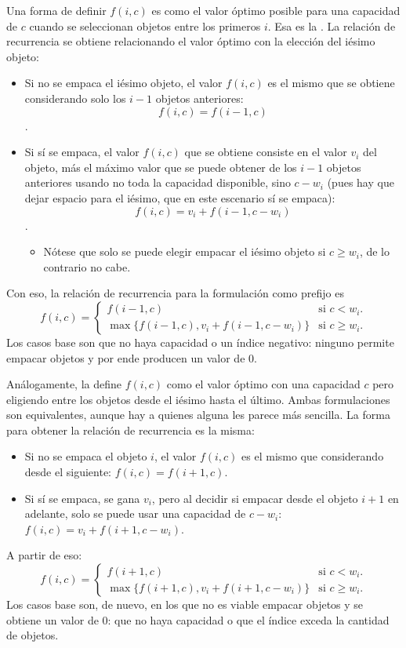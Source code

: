 Una forma de definir \(f(i, c)\) es como el valor óptimo posible para una capacidad de \(c\) cuando se seleccionan objetos entre los primeros \(i\). Esa es la . La relación de recurrencia se obtiene relacionando el valor óptimo con la elección del iésimo objeto:
\begin{itemize}
  \item Si no se empaca el iésimo objeto, el valor \(f(i, c)\) es el mismo que se obtiene considerando solo los \(i-1\) objetos anteriores: \[f(i, c) = f(i-1, c)\].
  \item Si sí se empaca, el valor \(f(i, c)\) que se obtiene consiste en el valor \(v_i\) del objeto, más el máximo valor que se puede obtener de los \(i-1\) objetos anteriores usando no toda la capacidad disponible, sino \(c-w_i\) (pues hay que dejar espacio para el iésimo, que en este escenario sí se empaca): \[f(i, c) = v_i + f(i-1, c-w_i)\].
  \begin{itemize}
    \item Nótese que solo se puede elegir empacar el iésimo objeto si \(c \geq w_i\), de lo contrario no cabe.
  \end{itemize}
\end{itemize}
Con eso, la relación de recurrencia para la formulación como prefijo es
\[
f(i, c) = \begin{cases}
  f(i-1, c) & \text{si } c < w_i. \\
  \max\{f(i-1, c), v_i + f(i-1, c-w_i)\} & \text{si } c \geq w_i.
\end{cases}
\]
Los casos base son que no haya capacidad o un índice negativo: ninguno permite empacar objetos y por ende producen un valor de 0.

Análogamente, la  define \(f(i, c)\) como el valor óptimo con una capacidad \(c\) pero eligiendo entre los objetos desde el iésimo hasta el último. Ambas formulaciones son equivalentes, aunque hay a quienes alguna les parece más sencilla. La forma para obtener la relación de recurrencia es la misma:
\begin{itemize}
  \item Si no se empaca el objeto \(i\), el valor \(f(i, c)\) es el mismo que considerando desde el siguiente: \(f(i, c) = f(i+1, c)\).
  \item Si sí se empaca, se gana \(v_i\), pero al decidir si empacar desde el objeto \(i+1\) en adelante, solo se puede usar una capacidad de \(c-w_i\): \(f(i, c) = v_i + f(i+1, c-w_i)\).
\end{itemize}
A partir de eso:
\[
f(i, c) = \begin{cases}
  f(i+1, c) & \text{si } c < w_i. \\
  \max\{f(i+1, c), v_i + f(i+1, c-w_i)\} & \text{si } c \geq w_i.
\end{cases}
\]
Los casos base son, de nuevo, en los que no es viable empacar objetos y se obtiene un valor de 0: que no haya capacidad o que el índice exceda la cantidad de objetos.

